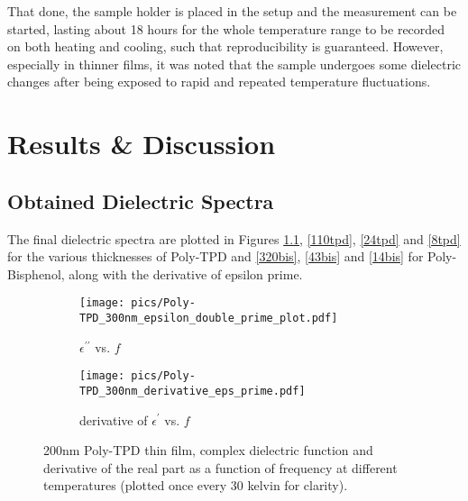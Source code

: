 That done, the sample holder is placed in the setup and the measurement can be started, lasting about 18 hours for the whole temperature range to be recorded on both heating and cooling, such that reproducibility is guaranteed. However, especially in thinner films, it was noted that the sample undergoes some dielectric changes after being exposed to rapid and repeated temperature fluctuations.

\chapter{Results \& Discussion}

\section{Obtained Dielectric Spectra}
The final dielectric spectra are plotted in Figures \ref{300tpd}, \ref{110tpd}, \ref{24tpd} and \ref{8tpd} for the various thicknesses of Poly-TPD and \ref{320bis}, \ref{43bis} and \ref{14bis} for Poly-Bisphenol, along with the derivative of epsilon prime.
%

\begin{figure}[!htb]
\centering
\begin{subfigure}[t]{.5\textwidth}
  \centering
  \texttt{[image: pics/Poly-TPD\_300nm\_epsilon\_double\_prime\_plot.pdf]}
  \caption{$\epsilon^{\prime\prime}$ vs. $f$}
\end{subfigure}%
\begin{subfigure}[t]{.5\textwidth}
  \centering
  \texttt{[image: pics/Poly-TPD\_300nm\_derivative\_eps\_prime.pdf]}
  \caption{derivative of $\epsilon^\prime$ vs. $f$}
\end{subfigure}
\caption{200nm Poly-TPD thin film, complex dielectric function and derivative of the real part as a function of frequency at different temperatures (plotted once every 30 kelvin for clarity).}
  \label{300tpd}
\end{figure}

